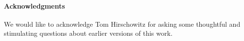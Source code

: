 \documentclass[]{acm_proc_article-sp}
\numberwithin{equation}{subsection}
\begin{document}
\paragraph{Acknowledgments}
We would like to acknowledge Tom Hirschowitz for asking some thoughtful
and stimulating questions about earlier versions of this work.







\end{document}
